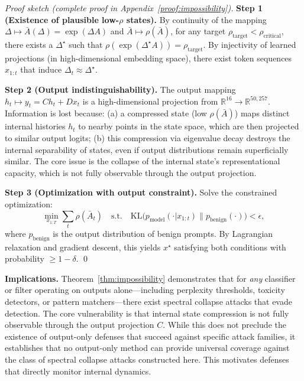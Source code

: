 \documentclass[10pt,twocolumn]{article}
\begin{document}
\begin{proof}[Proof sketch (complete proof in Appendix~\ref{proof:impossibility})]
\textbf{Step 1 (Existence of plausible low-$\rho$ states).} By continuity of the mapping $\Delta \mapsto \bar{A}(\Delta) = \exp(\Delta A)$ and $\bar{A} \mapsto \rho(\bar{A})$, for any target $\rho_{\text{target}} < \rho_{\text{critical}}$, there exists a $\Delta^\star$ such that $\rho(\exp(\Delta^\star A)) = \rho_{\text{target}}$. By injectivity of learned projections (in high-dimensional embedding space), there exist token sequences $x_{1:t}$ that induce $\Delta_t \approx \Delta^\star$.

\textbf{Step 2 (Output indistinguishability).} The output mapping $h_t \mapsto y_t = C h_t + D x_t$ is a high-dimensional projection from $\mathbb{R}^{16} \to \mathbb{R}^{50,257}$. Information is lost because: (a) a compressed state (low $\rho(\bar{A})$) maps distinct internal histories $h_t$ to nearby points in the state space, which are then projected to similar output logits; (b) this compression via eigenvalue decay destroys the internal separability of states, even if output distributions remain superficially similar. The core issue is the collapse of the internal state's representational capacity, which is not fully observable through the output projection.

\textbf{Step 3 (Optimization with output constraint).} Solve the constrained optimization:
\begin{equation}
\min_{x_{1:T}} \sum_{t} \rho(\bar{A}_t) \quad \text{s.t.} \quad \text{KL}\big(p_{\text{model}}(\cdot|x_{1:t}) \| p_{\text{benign}}(\cdot)\big) < \epsilon,
\end{equation}
where $p_{\text{benign}}$ is the output distribution of benign prompts. By Lagrangian relaxation and gradient descent, this yields $x^\star$ satisfying both conditions with probability $\ge 1-\delta$. \qed
\end{proof}

\textbf{Implications.} Theorem~\ref{thm:impossibility} demonstrates that for \emph{any} classifier or filter operating on outputs alone---including perplexity thresholds, toxicity detectors, or pattern matchers---there exist spectral collapse attacks that evade detection. The core vulnerability is that internal state compression is not fully observable through the output projection $C$. While this does not preclude the existence of output-only defenses that succeed against specific attack families, it establishes that no output-only method can provide universal coverage against the class of spectral collapse attacks constructed here. This motivates defenses that directly monitor internal dynamics.
\end{document}
